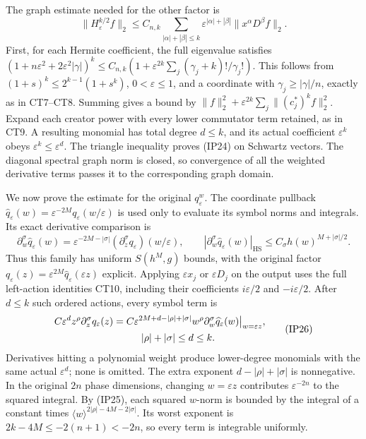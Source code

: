 \documentclass[
  11pt,
]{article}
\begin{document}
The graph estimate needed for the other factor is \[
 \|H_\varepsilon^{k/2}f\|_2
 \leq C_{n,k}\sum_{|\alpha|+|\beta|\leq k}
           \varepsilon^{|\alpha|+|\beta|}
                          \|x^\alpha D^\beta f\|_2.             \tag{IP24}
\] First, for each Hermite coefficient, the full eigenvalue satisfies
\((1+n\varepsilon^2+2\varepsilon^2|\gamma|)^k
 \leq C_{n,k}(1+\varepsilon^{2k}\sum_j(\gamma_j+k)!/\gamma_j!)\). This
follows from \((1+s)^k\leq2^{k-1}(1+s^k)\), \(0<\varepsilon\leq1\), and
a coordinate with \(\gamma_j\geq|\gamma|/n\), exactly as in CT7--CT8.
Summing gives a bound by
\(\|f\|_2^2+\varepsilon^{2k}\sum_j\|(c_j^*)^kf\|_2^2\). Expand each
creator power with every lower commutator term retained, as in CT9. A
resulting monomial has total degree \(d\leq k\), and its actual
coefficient \(\varepsilon^k\) obeys \(\varepsilon^k\leq\varepsilon^d\).
The triangle inequality proves (IP24) on Schwartz vectors. The diagonal
spectral graph norm is closed, so convergence of all the weighted
derivative terms passes it to the corresponding graph domain.

We now prove the estimate for the original \(q_\varepsilon^w\). The
coordinate pullback
\(\widehat q_\varepsilon(w)=\varepsilon^{-2M}q_\varepsilon(w/\varepsilon)\)
is used only to evaluate its symbol norms and integrals. Its exact
derivative comparison is \[
 \partial_w^\sigma\widehat q_\varepsilon(w)
   =\varepsilon^{-2M-|\sigma|}
          (\partial_z^\sigma q_\varepsilon)(w/\varepsilon),
 \qquad
 |\partial_w^\sigma\widehat q_\varepsilon(w)|_{\mathrm{HS}}
       \leq C_\sigma h(w)^{M+|\sigma|/2}.                       \tag{IP25}
\] Thus this family has uniform \(S(h^M,g)\) bounds, with the original
factor
\(q_\varepsilon(z)=\varepsilon^{2M}\widehat q_\varepsilon(\varepsilon z)\)
explicit. Applying \(\varepsilon x_j\) or \(\varepsilon D_j\) on the
output uses the full left-action identities CT10, including their
coefficients \(i\varepsilon/2\) and \(-i\varepsilon/2\). After
\(d\leq k\) such ordered actions, every symbol term is \[
 \begin{split}
 C\varepsilon^d z^\rho\partial_z^\sigma q_\varepsilon(z)
 &=C\varepsilon^{2M+d-|\rho|+|\sigma|}
       w^\rho\partial_w^\sigma\widehat q_\varepsilon(w)
          \big|_{w=\varepsilon z},\\
 &\hspace{10mm}|\rho|+|\sigma|\leq d\leq k.
 \end{split}                                                     \tag{IP26}
\] Derivatives hitting a polynomial weight produce lower-degree
monomials with the same actual \(\varepsilon^d\); none is omitted. The
extra exponent \(d-|\rho|+|\sigma|\) is nonnegative. In the original
\(2n\) phase dimensions, changing \(w=\varepsilon z\) contributes
\(\varepsilon^{-2n}\) to the squared integral. By (IP25), each squared
\(w\)-norm is bounded by the integral of a constant times
\(\langle w\rangle^{2|\rho|-4M-2|\sigma|}\). Its worst exponent is
\(2k-4M\leq-2(n+1)<-2n\), so every term is integrable uniformly.
\end{document}
